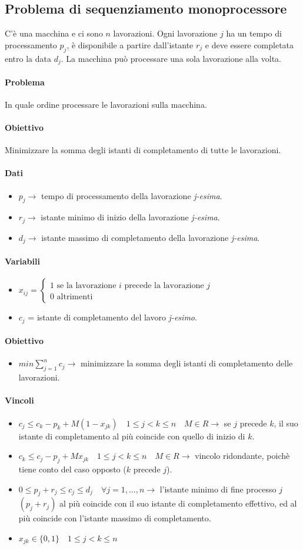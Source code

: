 \documentclass[12pt, twoside, letterpaper]{article}
\newcommand{\casi}[3]{
	$#1 = \begin{cases} \text{#2} \\ \text{#3} \end{cases}$
}
\newcommand{\problemai}[5]{
	#1
	\begin{dati}
		\paragraph{Dati} 
			\begin{itemize}
				#2
			\end{itemize}
	\end{dati}
	\begin{variabili}
		\paragraph{Variabili} 
			\begin{itemize}
				#3
			\end{itemize}
	\end{variabili}
	\begin{obiettivo}
		\paragraph{Obiettivo} 
			\begin{itemize}
				#4
			\end{itemize}
	\end{obiettivo}
	\begin{vincoli}
		\paragraph{Vincoli}
			\begin{itemize}
				#5
			\end{itemize}
	\end{vincoli}
}
\begin{document}
		\subsection{Problema di sequenziamento monoprocessore}
			\problemai{
				C'è una macchina e ci sono $n$ lavorazioni. Ogni lavorazione $j$ ha un tempo di processamento $p_j$, è disponibile a partire dall'istante $r_j$ e deve essere completata entro la data $d_j$. La macchina può processare una sola lavorazione alla volta. 
				
				\paragraph{Problema} In quale ordine processare le lavorazioni sulla macchina.
				\paragraph{Obiettivo} Minimizzare la somma degli istanti di completamento di tutte le lavorazioni.
			}{
				\item $p_j \rightarrow$ tempo di processamento della lavorazione \textit{j-esima}.
				\item $r_j \rightarrow$ istante minimo di inizio della lavorazione \textit{j-esima}.
				\item $d_j \rightarrow$ istante massimo di completamento della lavorazione \textit{j-esima}.
			}{
				\item \casi{x_{ij}}{1 se la lavorazione $i$ precede la lavorazione $j$}{0 altrimenti}
				\item $c_j$ = istante di completamento del lavoro \textit{j-esimo}.
			}{
				\item $min \sum_{j=1}^n c_j \rightarrow$ minimizzare la somma degli istanti di completamento delle lavorazioni.
			}{
				\item $c_j \leq c_k - p_k + M (1-x_{jk}) \quad 1 \leq j < k \leq n \quad M \in R \rightarrow$ se $j$ precede $k$, il suo istante di completamento al più coincide con quello di inizio di $k$.
				\item $c_k \leq c_j - p_j + M x_{jk} \quad 1 \leq j < k \leq n \quad M \in R \rightarrow$ vincolo ridondante, poichè tiene conto del caso opposto ($k$ precede $j$).
				\item $0 \leq p_j + r_j \leq c_j \leq d_j \quad \forall j = 1, \dots, n \rightarrow$ l'istante minimo di fine processo $j$ $(p_j+r_j)$ al più coincide con il suo istante di completamento effettivo, ed al più coincide con l'istante massimo di completamento.
				\item $x_{jk} \in \{0,1\} \quad 1 \leq j < k \leq n$
			}
			
\end{document}
